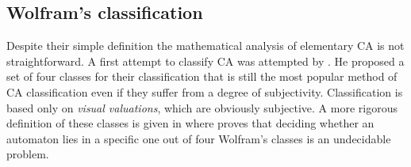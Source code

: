 \subsection{Wolfram's classification}
	Despite their simple definition the mathematical analysis of elementary CA is not straightforward. A first attempt to classify CA was attempted by \citeauthor{wolfram2002} \cite{wolfram2002}. He proposed a set of four classes for their
classification that is still the most popular method of CA classification even if they
suffer from a degree of subjectivity.
Classification is based only on \textit{visual valuations}, which are obviously subjective. 
A more rigorous definition of these classes is given in \cite{culik1998} where \citeauthor{culik1998} proves that deciding whether an automaton lies in a specific one out of four Wolfram's classes is an undecidable problem.

